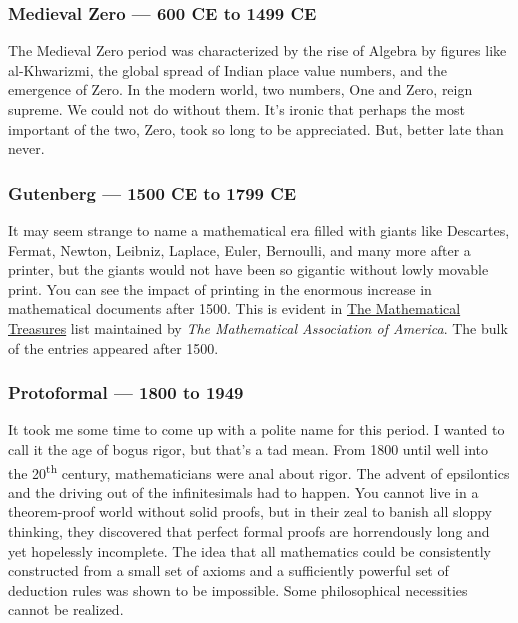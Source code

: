 \subsubsection*{Medieval Zero --- 600 CE to 1499 CE}%

The Medieval Zero period was characterized by the rise of Algebra by
figures like al-Khwarizmi, the global spread of Indian place value
numbers, and the emergence of Zero. In the modern world, two numbers,
One and Zero, reign supreme. We could not do without them. It's ironic
that perhaps the most important of the two, Zero, took so long to be
appreciated. But, better late than never.

\subsubsection*{Gutenberg --- 1500 CE to 1799 CE}%

It may seem strange to name a mathematical era filled with giants like
Descartes, Fermat, Newton, Leibniz, Laplace, Euler, Bernoulli, and many
more after a printer, but the giants would not have been so gigantic
without lowly movable print. You can see the impact of printing in the
enormous increase in mathematical documents after 1500. This is evident
in \href{https://maa.org/press/periodicals/convergence/index-to-mathematical-treasures}{The
Mathematical Treasures} list maintained by \emph{The Mathematical
Association of America}. The bulk of the entries appeared after 1500.

\subsubsection*{Protoformal --- 1800 to 1949}%

It took me some time to come up with a polite name for this period. I
wanted to call it the age of bogus rigor, but that's a tad mean. From
1800 until well into the 20\textsuperscript{th} century, mathematicians
were anal about rigor. The advent of epsilontics and the driving out of
the infinitesimals had to happen. You cannot live in a theorem-proof
world without solid proofs, but in their zeal to banish all sloppy
thinking, they discovered that perfect formal proofs are horrendously
long and yet hopelessly incomplete. The idea that all mathematics could
be consistently constructed from a small set of axioms and a
sufficiently powerful set of deduction rules was shown to be impossible.
Some philosophical necessities cannot be realized.

